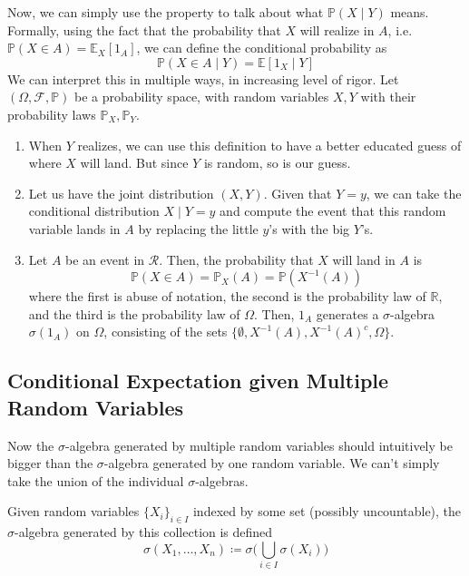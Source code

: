 \documentclass{article}
\begin{document}
    Now, we can simply use the property to talk about what $\mathbb{P}(X \mid Y)$ means. Formally, using the fact that the probability that $X$ will realize in $A$, i.e. $\mathbb{P}(X \in A) = \mathbb{E}_X[1_A]$, we can define the conditional probability as 
    \begin{equation}
      \mathbb{P}(X \in A \mid Y) = \mathbb{E}[ 1_X \mid Y]
    \end{equation}
    We can interpret this in multiple ways, in increasing level of rigor. Let $(\Omega, \mathcal{F}, \mathbb{P})$ be a probability space, with random variables $X, Y$ with their probability laws $\mathbb{P}_X, \mathbb{P}_Y$. 
    \begin{enumerate}
      \item When $Y$ realizes, we can use this definition to have a better educated guess of where $X$ will land. But since $Y$ is random, so is our guess. 
      
      \item Let us have the joint distribution $(X, Y)$. Given that $Y = y$, we can take the conditional distribution $X \mid Y = y$ and compute the event that this random variable lands in $A$ by replacing the little $y$'s with the big $Y$'s. 
      
      \item Let $A$ be an event in $\mathcal{R}$. Then, the probability that $X$ will land in $A$ is 
      \begin{equation}
        \mathbb{P}(X \in A) = \mathbb{P}_X(A) = \mathbb{P}(X^{-1} (A))
      \end{equation}
      where the first is abuse of notation, the second is the probability law of $\mathbb{R}$, and the third is the probability law of $\Omega$. Then, $1_A$ generates a $\sigma$-algebra $\sigma(1_A)$ on $\Omega$, consisting of the sets $\{\emptyset, X^{-1}(A), X^{-1}(A)^c, \Omega\}$. 
    \end{enumerate}

  \subsection{Conditional Expectation given Multiple Random Variables}

    Now the $\sigma$-algebra generated by multiple random variables should intuitively be bigger than the $\sigma$-algebra generated by one random variable. We can't simply take the union of the individual $\sigma$-algebras. 

    \begin{definition}
      Given random variables $\{X_i\}_{i \in I}$ indexed by some set (possibly uncountable), the $\sigma$-algebra generated by this collection is defined 
      \begin{equation}
        \sigma(X_1, \ldots, X_n) \coloneqq \sigma \bigg( \bigcup_{i \in I} \sigma(X_i) \bigg)
      \end{equation}
    \end{definition}
\end{document}
